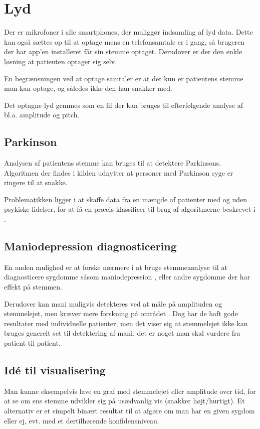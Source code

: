\section{Lyd}
Der er mikrofoner i alle smartphones, der muliggør indsamling af lyd data.
Dette kan også sættes op til at optage mens en telefonsamtale er i gang, så brugeren der har app'en installeret får sin stemme optaget.
Derudover er der den enkle løsning at patienten optager sig selv.

En begrænsningen ved at optage samtaler er at det kun er patientens stemme man kan optage, og således ikke den han snakker med.

Det optagne lyd gemmes som en fil der kan bruges til efterfølgende analyse af bl.a. amplitude og pitch.

\subsection{Parkinson}
Analysen af patientens stemme kan bruges til at detektere Parkinsons\citep{6168572}.
Algoritmen der findes i kilden udnytter at personer med Parkinson syge er ringere til at snakke.

Problematikken ligger i at skaffe data fra en mængde af patienter med og uden psykiske lidelser, for at få en præcis klassificer til brug af algoritmerne beskrevet i \citep{6168572,6346375}.

\subsection{Maniodepression diagnosticering}
En anden mulighed er at forske nærmere i at bruge stemmeanalyse til at diagnosticere sygdomme såsom maniodepression \citep{6346375}, eller andre sygdomme der har effekt på stemmen.

Derudover kan mani muligvis detekteres ved at måle på amplituden og stemmelejet, men kræver mere forskning på området \citep{6346375}.
Dog har de haft gode resultater med individuelle patienter, men det viser sig at stemmelejet ikke kan bruges generelt set til detektering af mani, det er noget man skal vurdere fra patient til patient.
	
\subsection{Idé til visualisering}
Man kunne eksempelvis lave en graf med stemmelejet eller amplitude over tid, for at se om ens stemme udvikler sig på usædvanlig vis (snakker højt/hurtigt).
Et alternativ er et simpelt binært resultat til at afgøre om man har en given sygdom eller ej, evt. med et dertilhørende konfidensniveau.
